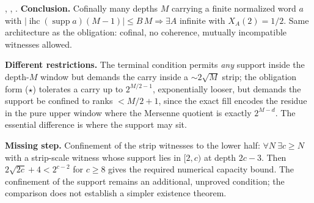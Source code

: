 \begin{obs}
,
,
.
\textbf{Conclusion.} Cofinally many depths $M$ carrying a finite normalized word $a$ with
$|\ensuremath{\operatorname{ihc}}(\operatorname{supp}a)(M{-}1)| \le \ensuremath{B}\,M
\Rightarrow \exists A$ infinite with $X_{A}(2)=1/2$. Same architecture
as the obligation: cofinal, no coherence, mutually incompatible witnesses allowed.

\par\medskip

\textbf{Different restrictions.} The terminal condition permits \emph{any} support inside the depth-$M$ window but
demands the carry inside a $\sim 2\sqrt M$ strip; the obligation form ($\star$) tolerates a carry
up to $2^{M/2-1}$, exponentially looser, but demands the support be confined to ranks $<
M/2+1$, since the exact fill encodes the residue in the pure upper window where the Mersenne
quotient is exactly $2^{M-d}$.  The essential difference is where the support may sit.

\par\medskip

\textbf{Missing step.} Confinement of the strip witnesses to the lower half: $\forall N\
\exists c\ge N$ with a strip-scale witness whose support lies in $[2,c)$ at depth $2c{-}3$. Then
$2\sqrt{2c}+4<2^{c-2}$ for $c\ge8$ gives the required numerical
capacity bound.  The confinement of the support remains an additional,
unproved condition; the comparison does not establish a simpler
existence theorem.
\end{obs}

